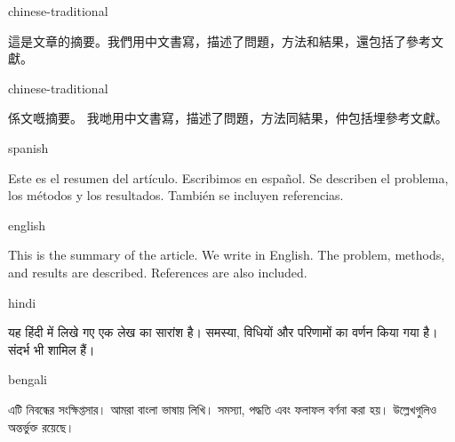 \documentclass[colorlinks,nofoot,fontspec,spanish,japanese,russian,greek,ukrainian,vietnamese,french,portuguese,turkish,polish,indonesian,italian,german,latin,serbianc,bidi=basic]{asmeconf}
\begin{document}
\begin{selectlanguage}{chinese-traditional}%
\begin{abstract*}
這是文章的摘要。我們用中文書寫，描述了問題，方法和結果，還包括了參考文獻。
\end{abstract*}
\end{selectlanguage}%

\begin{selectlanguage}{chinese-traditional}%
\begin{abstract*}
係文嘅摘要。 我哋用中文書寫，描述了問題，方法同結果，仲包括埋參考文獻。
\end{abstract*}
\end{selectlanguage}%

{\NotoSerif
\begin{selectlanguage}{spanish}
\begin{abstract*}
Este es el resumen del artículo. Escribimos en español. Se describen el problema, los métodos y los resultados. También se incluyen referencias.
\end{abstract*}
\end{selectlanguage}%

\begin{selectlanguage}{english}
\begin{abstract*}
This is the summary of the article. We write in English. The problem, methods, and results are described. References are also included.
\end{abstract*}
\end{selectlanguage}%
}%

\begin{selectlanguage}{hindi}
\begin{abstract*}
यह हिंदी में लिखे गए एक लेख का सारांश है। समस्या, विधियों और परिणामों का वर्णन किया गया है। संदर्भ भी शामिल हैं।
\end{abstract*}
\end{selectlanguage}%

\begin{selectlanguage}{bengali}
\begin{abstract*}
এটি নিবন্ধের সংক্ষিপ্তসার। আমরা বাংলা ভাষায় লিখি। সমস্যা, পদ্ধতি এবং ফলাফল বর্ণনা করা হয়। উল্লেখগুলিও অন্তর্ভুক্ত রয়েছে।
\end{abstract*}
\end{selectlanguage}%
\end{document}
